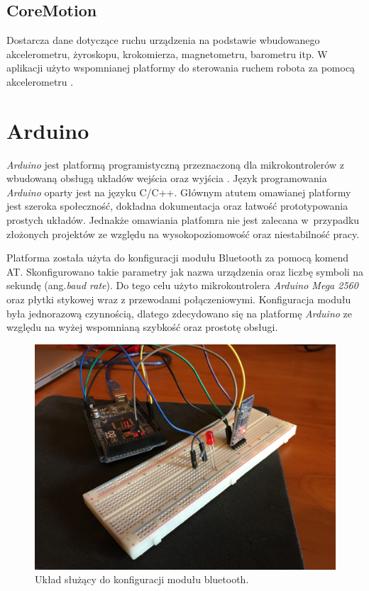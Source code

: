 \subsection{CoreMotion}
Dostarcza dane dotyczące ruchu urządzenia na podstawie wbudowanego akcelerometru, żyroskopu, krokomierza, magnetometru, barometru itp. W aplikacji użyto wspomnianej platformy do sterowania ruchem robota za pomocą akcelerometru \cite{AppleDocumentation}.

\section{Arduino}
\textit{Arduino} jest platformą programistyczną przeznaczoną dla mikrokontrolerów z wbudowaną obsługą układów wejścia oraz wyjścia \cite{Arduino}. Język programowania \textit{Arduino} oparty jest na języku C/C++. Głównym atutem omawianej platformy jest szeroka społeczność, dokładna dokumentacja oraz łatwość prototypowania prostych układów. Jednakże omawiania platfomra nie jest zalecana w~przypadku złożonych projektów ze względu na wysokopoziomowość oraz niestabilność pracy.

Platforma została użyta do konfiguracji modułu Bluetooth za pomocą komend AT. Skonfigurowano takie parametry jak nazwa urządzenia oraz liczbę symboli na sekundę (ang.\textit{baud rate}). Do tego celu użyto mikrokontrolera \textit{Arduino Mega 2560} oraz płytki stykowej wraz z przewodami połączeniowymi. Konfiguracja modułu była jednorazową czynnością, dlatego zdecydowano się na platformę \textit{Arduino} ze względu na wyżej wspomnianą szybkość oraz prostotę obsługi.
  

\begin{figure}[H]
	\centering
		\includegraphics[width=0.75\linewidth]{pic02/arduino.JPG}
	\caption{Układ służący do konfiguracji modułu bluetooth.}
	\label{fig:arduino}	
\end{figure}

